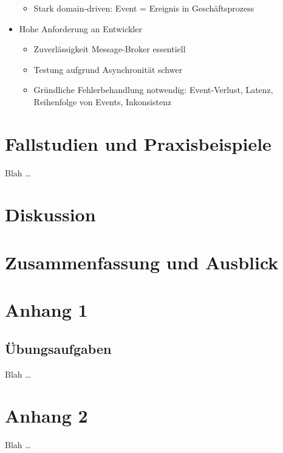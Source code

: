 \documentclass[acmtog]{acmart}
\begin{document}
\begin{itemize}
\begin{itemize}
    \item Stark domain-driven: Event = Ereignis in Geschäftsprozess
  \end{itemize}
  \item Hohe Anforderung an Entwickler
  \begin{itemize}
    \item Zuverlässigkeit Message-Broker essentiell
    \item Testung aufgrund Asynchronität schwer
    \item Gründliche Fehlerbehandlung notwendig: Event-Verlust, Latenz, Reihenfolge von Events, Inkonsistenz
  \end{itemize}
\end{itemize}



\section{Fallstudien und Praxisbeispiele}
Blah \ldots

\section{Diskussion}

\section{Zusammenfassung und Ausblick}









\appendix

\section{Anhang 1}

\subsection{Übungsaufgaben}
Blah \ldots

\section{Anhang 2}
Blah \ldots
\end{document}
